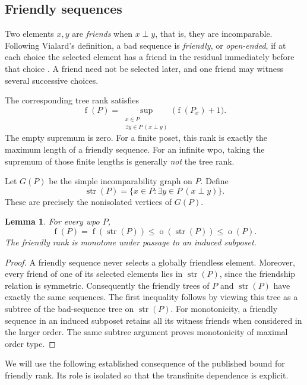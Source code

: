 \documentclass[11pt,a4paper]{article}
\newtheorem{lemma}[lemma]{Lemma}
\theoremstyle{definition}
\theoremstyle{remark}
\DeclareMathOperator{\mot}{o}
\DeclareMathOperator{\fot}{f}
\DeclareMathOperator{\str}{str}
\newcommand{\inc}{\mathbin{\perp}}
\begin{document}
\subsection{Friendly sequences}

Two elements $x,y$ are \emph{friends} when $x\inc y$, that is, they are
incomparable. Following Vialard's definition, a bad sequence is
\emph{friendly}, or \emph{open-ended}, if at each choice the selected element
has a friend in the residual immediately before that choice
\cite[Definition~3.3]{Vialard2023}. A friend need not be selected later, and
one friend may witness several successive choices.

The corresponding tree rank satisfies
\begin{equation}\label{eq:f-rec}
\boxed{\displaystyle
\fot(P)=\sup_{\substack{x\in P\\\exists y\in P\ (x\inc y)}}
             \bigl(\fot(P_x)+1\bigr).}
\end{equation}
The empty supremum is zero. For a finite poset, this rank is exactly the
maximum length of a friendly sequence. For an infinite wpo, taking the
supremum of those finite lengths is generally \emph{not} the tree rank.

Let $G(P)$ be the simple incomparability graph on $P$. Define
\[
\str(P)=\{x\in P:\exists y\in P\ (x\inc y)\}.
\]
These are precisely the nonisolated vertices of $G(P)$.

\begin{lemma}\label{lem:strip}
For every wpo $P$,
\[
\fot(P)=\fot(\str(P))\leq\mot(\str(P))\leq\mot(P).
\]
The friendly rank is monotone under passage to an induced subposet.
\end{lemma}
\begin{proof}
A friendly sequence never selects a globally friendless element. Moreover,
every friend of one of its selected elements lies in $\str(P)$, since the
friendship relation is symmetric. Consequently the friendly trees of $P$
and $\str(P)$ have exactly the same sequences. The first inequality follows
by viewing this tree as a subtree of the bad-sequence tree on $\str(P)$.
For monotonicity, a friendly sequence in an induced subposet retains all its
witness friends when considered in the larger order. The same subtree
argument proves monotonicity of maximal order type.
\end{proof}

We will use the following established consequence of the published bound
for friendly rank. Its role is isolated so that the transfinite dependence
is explicit.
\end{document}
